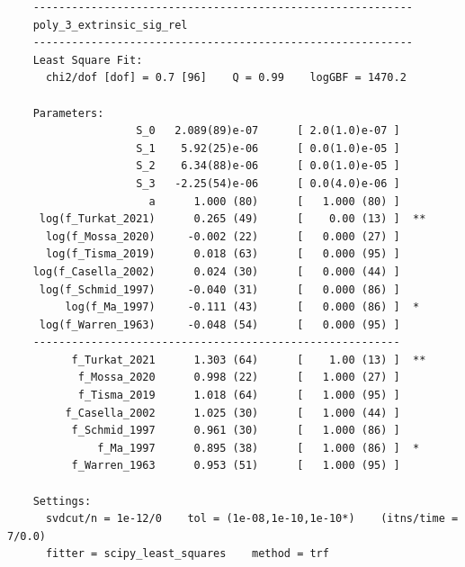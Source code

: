 \documentclass[prd,10pt,superscriptaddress,notitlepage,tightenlines,nofootinbib,floatfix]{revtex4-1}
\begin{document}
\begin{verbatim}
    -----------------------------------------------------------
    poly_3_extrinsic_sig_rel
    -----------------------------------------------------------
    Least Square Fit:
      chi2/dof [dof] = 0.7 [96]    Q = 0.99    logGBF = 1470.2
    
    Parameters:
                    S_0   2.089(89)e-07      [ 2.0(1.0)e-07 ]
                    S_1    5.92(25)e-06      [ 0.0(1.0)e-05 ]
                    S_2    6.34(88)e-06      [ 0.0(1.0)e-05 ]
                    S_3   -2.25(54)e-06      [ 0.0(4.0)e-06 ]
                      a      1.000 (80)      [   1.000 (80) ]
     log(f_Turkat_2021)      0.265 (49)      [    0.00 (13) ]  **
      log(f_Mossa_2020)     -0.002 (22)      [   0.000 (27) ]
      log(f_Tisma_2019)      0.018 (63)      [   0.000 (95) ]
    log(f_Casella_2002)      0.024 (30)      [   0.000 (44) ]
     log(f_Schmid_1997)     -0.040 (31)      [   0.000 (86) ]
         log(f_Ma_1997)     -0.111 (43)      [   0.000 (86) ]  *
     log(f_Warren_1963)     -0.048 (54)      [   0.000 (95) ]
    ---------------------------------------------------------
          f_Turkat_2021      1.303 (64)      [    1.00 (13) ]  **
           f_Mossa_2020      0.998 (22)      [   1.000 (27) ]
           f_Tisma_2019      1.018 (64)      [   1.000 (95) ]
         f_Casella_2002      1.025 (30)      [   1.000 (44) ]
          f_Schmid_1997      0.961 (30)      [   1.000 (86) ]
              f_Ma_1997      0.895 (38)      [   1.000 (86) ]  *
          f_Warren_1963      0.953 (51)      [   1.000 (95) ]
    
    Settings:
      svdcut/n = 1e-12/0    tol = (1e-08,1e-10,1e-10*)    (itns/time = 7/0.0)
      fitter = scipy_least_squares    method = trf
    
\end{verbatim}







\end{document}
